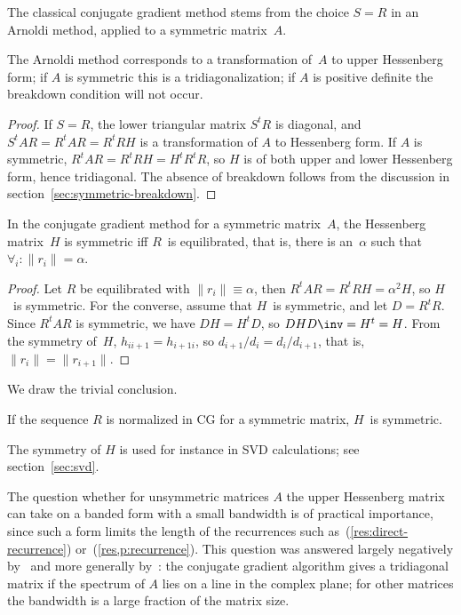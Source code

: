 \documentclass[11pt]{artikel3}
\begin{document}
\begin{Outline}
The classical conjugate gradient method stems from the choice $S=R$
in an Arnoldi method, applied to a symmetric matrix~$A$.

\begin{lemma}\label{lemma:cg-tri}
The Arnoldi method corresponds to a transformation of~$A$
to upper Hessenberg form; if $A$ is symmetric this is a
tridiagonalization; if $A$ is positive definite the breakdown
condition will not occur.
\end{lemma}
\begin{proof} 
If $S=R$, the lower triangular matrix $S^tR$ is diagonal, and
$S^tAR=R^tAR=R^tRH$ is a transformation of $A$ to Hessenberg form.  If
$A$ is symmetric, $R^tAR=R^tRH=H^tR^tR$, so $H$ is of both upper and lower
Hessenberg form, hence tridiagonal.  The absence of breakdown follows
from the discussion in section~\ref{sec:symmetric-breakdown}.
\end{proof}

\begin{lemma}\label{lemma:symmetric-H}
In the conjugate gradient method for a
symmetric matrix~$A$, the Hessenberg matrix~$H$ is symmetric iff
$R$~is equilibrated, that is, there is an~$\alpha$ such that
$\forall_i\colon\|r_i\|=\alpha$.
\end{lemma}

\begin{proof}
Let $R$ be equilibrated with $\|r_i\|\equiv\alpha$, then
$R^tAR=R^tRH=\alpha^2 H$, so $H$~is symmetric.  For the converse,
assume that $H$~is symmetric, and let $D=R^tR$. Since $R^tAR$ is
symmetric, we have $DH=H^tD$, so $DHD\inv=H^t=H$. From the symmetry
of~$H$, $h_{ii+1}=h_{i+1i}$, so $d_{i+1}/d_i=d_i/d_{i+1}$, that is,
$\|r_i\|=\|r_{i+1}\|$.
\end{proof}

We draw the trivial conclusion.

\begin{corollary}
If the sequence $R$ is normalized in CG for a symmetric matrix, $H$~is
symmetric.
\end{corollary}

The symmetry of $H$ is used for instance in SVD calculations; see
section~\ref{sec:svd}.

The question whether for unsymmetric matrices $A$ the upper Hessenberg
matrix can take on a banded form with a small bandwidth is of
practical importance, since such a form limits the length of the
recurrences such as~(\ref{res:direct-recurrence})
or~(\ref{res,p:recurrence}). This question was answered largely
negatively by~\cite{Vo:cg} and more generally
by~\cite{FaberManteuffel:conditions-for-existence}: the conjugate
gradient algorithm gives a tridiagonal matrix if the spectrum of $A$
lies on a line in the complex plane; for other matrices the bandwidth
is a large fraction of the matrix size.


\end{Outline}
\end{document}
